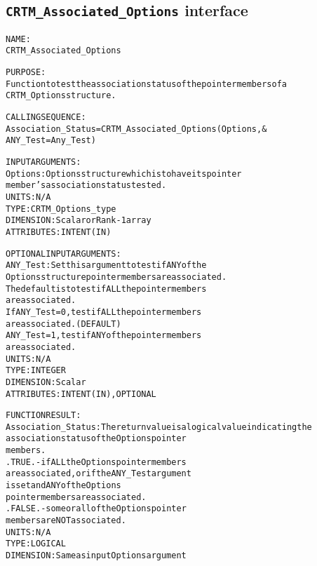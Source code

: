 \subsection{\texttt{CRTM\_Associated\_Options} interface}
  \label{sec:CRTM_Associated_Options_interface}
  \begin{alltt}
 
  NAME:
        CRTM_Associated_Options
 
  PURPOSE:
        Function to test the association status of the pointer members of a
        CRTM_Options structure.
 
  CALLING SEQUENCE:
        Association_Status = CRTM_Associated_Options( Options          , &
                                                      ANY_Test=Any_Test  )
 
  INPUT ARGUMENTS:
        Options:             Options structure which is to have its pointer
                             member's association status tested.
                             UNITS:      N/A
                             TYPE:       CRTM_Options_type
                             DIMENSION:  Scalar or Rank-1 array
                             ATTRIBUTES: INTENT(IN)
 
  OPTIONAL INPUT ARGUMENTS:
        ANY_Test:            Set this argument to test if ANY of the
                             Options structure pointer members are associated.
                             The default is to test if ALL the pointer members
                             are associated.
                             If ANY_Test = 0, test if ALL the pointer members
                                              are associated.  (DEFAULT)
                                ANY_Test = 1, test if ANY of the pointer members
                                              are associated.
                             UNITS:      N/A
                             TYPE:       INTEGER
                             DIMENSION:  Scalar
                             ATTRIBUTES: INTENT(IN), OPTIONAL
 
  FUNCTION RESULT:
        Association_Status:  The return value is a logical value indicating the
                             association status of the Options pointer
                             members.
                             .TRUE.  - if ALL the Options pointer members
                                       are associated, or if the ANY_Test argument
                                       is set and ANY of the Options
                                       pointer members are associated.
                             .FALSE. - some or all of the Options pointer
                                       members are NOT associated.
                             UNITS:      N/A
                             TYPE:       LOGICAL
                             DIMENSION:  Same as input Options argument
 
  \end{alltt}

